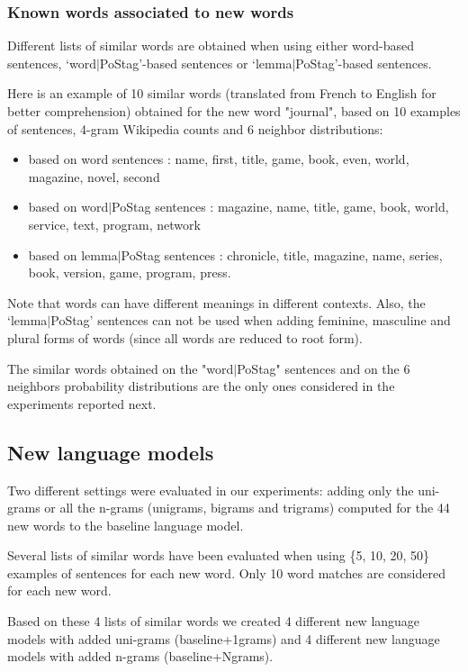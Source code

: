 \documentclass[conference]{IEEEtran}
\begin{document}
\subsubsection{Known words associated to new words}

Different lists of similar words are obtained when using either word-based sentences, `word$|$PoStag'-based sentences or `lemma$|$PoStag'-based sentences.

Here is an example of 10 similar words (translated from French to English for better comprehension) obtained for the new word "journal", based on 10 examples of sentences, 4-gram Wikipedia counts and 6 neighbor distributions:
\begin{itemize}
\item based on word sentences : name, first, title, game, book, even, world, magazine, novel, second
\item based on word$|$PoStag sentences : magazine, name, title, game, book, world, service, text, program, network
\item based on lemma$|$PoStag sentences : chronicle, title, magazine, name, series, book, version, game, program, press. 
\end{itemize}

Note that words can have different meanings in different contexts. Also, the `lemma$|$PoStag' sentences can not be used when adding feminine, masculine and plural forms of words (since all words are reduced to root form). 

The similar words obtained on the "word$|$PoStag" sentences and on the 6 neighbors probability distributions are the only ones considered in the experiments reported next. 

\subsection{New language models}

Two different settings were evaluated in our experiments: adding only the uni-grams or all the n-grams  (unigrams, bigrams and trigrams)  computed for the 44 new words to the baseline language model.

Several lists of similar words have been evaluated when using \{5, 10, 20, 50\} examples of sentences for each new word. Only 10 word matches are considered for each new word.

Based on these 4 lists of similar words we created 4 different new language models with added uni-grams (baseline+1grams) and 4 different new language models with added n-grams (baseline+Ngrams).    
\end{document}
